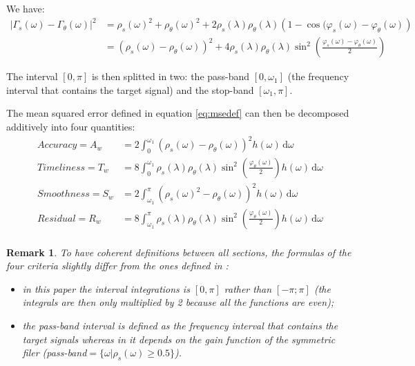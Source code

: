 \documentclass[
  12pt,
  ,
  a4paper]{article}
\newcommand\1{\mathds{1}}
\newcommand\ud{\,\mathrm{d}}
\newtheorem*{remark}{Remark}
\begin{document}
We have:
\begin{align}
\left|\Gamma_s(\omega)-\Gamma_\theta(\omega)\right|^{2} & =\rho_s(\omega)^{2}+\rho_\theta(\omega)^{2}+2\rho_s(\lambda)\rho_\theta(\lambda)\left(1-\cos(\varphi_s(\omega)-\varphi_\theta(\omega)\right) \nonumber\\
 & =\left(\rho_s(\omega)-\rho_\theta(\omega)\right)^{2}+4\rho_s(\lambda)\rho_\theta(\lambda)\sin^{2}\left(\frac{\varphi_s(\omega)-\varphi_\theta(\omega)}{2}\right)
 \label{eq:msedecomp}
\end{align}

The interval \([0,\pi]\) is then splitted in two: the pass-band \([0,\omega_1]\) (the frequency interval that contains the target signal) and the stop-band \([\omega_1,\pi]\).

The mean squared error defined in equation \eqref{eq:msedef} can then be decomposed additively into four quantities:
\begin{align*}
Accuracy =A_w&= 2\int_0^{\omega_1}\left(\rho_s(\omega)-\rho_\theta(\omega)\right)^{2}h(\omega)\ud\omega\\
Timeliness =T_w&= 8\int_0^{\omega_1}\rho_s(\lambda)\rho_\theta(\lambda)\sin^{2}\left(\frac{\varphi_\theta(\omega)}{2}\right)h(\omega)\ud\omega\\
Smoothness =S_w&= 2\int_{\omega_1}^\pi\left(\rho_s(\omega)^{2}-\rho_\theta(\omega)\right)^{2}h(\omega)\ud\omega\\
Residual =R_w&= 8\int_{\omega_1}^\pi\rho_s(\lambda)\rho_\theta(\lambda)\sin^{2}\left(\frac{\varphi_\theta(\omega)}{2}\right)h(\omega)\ud\omega\\
\end{align*}

\begin{remark}

To have coherent definitions between all sections, the formulas of the four criteria slightly differ from the ones defined in \textcite{trilemmaWMR2019}:

\begin{itemize}
\item
  in this paper the interval integrations is \([0,\pi]\) rather than \([-\pi;\pi]\) (the integrals are then only multiplied by 2 because all the functions are even);
\item
  the pass-band interval is defined as the frequency interval that contains the target signals whereas in \textcite{trilemmaWMR2019} it depends on the gain function of the symmetric filer (pass-band\(=\{\omega |\rho_s(\omega)\geq 0.5\}\)).
\end{itemize}

\end{remark}
\end{document}
